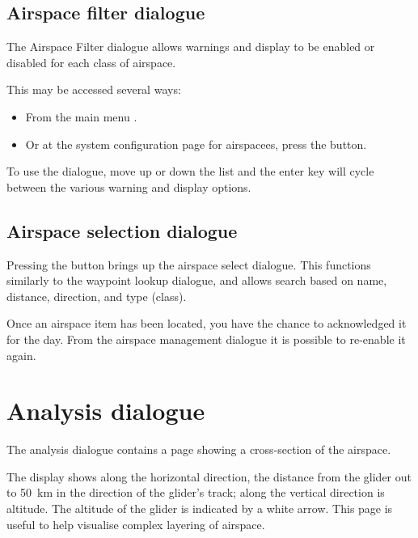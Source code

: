
\subsection*{Airspace filter dialogue}\label{sec:airspace-filter}

The Airspace Filter dialogue allows warnings and display to be enabled
or disabled for each class of airspace.  

This may be accessed several ways:
\begin{itemize}
\item From the main menu \blink{}.
\item Or at the system configuration page for airspacees, press the  button.
\end{itemize}

To use the dialogue, move up or down the list and the enter key will
cycle between the various warning and display options.

\subsection*{Airspace selection dialogue}

Pressing the  button brings up the airspace select dialogue.
This functions similarly to the waypoint lookup dialogue, and allows
search based on name, distance, direction, and type (class).  

Once an airspace item has been located, you have the chance to acknowledged it 
for the day.  From the
airspace management dialogue it is possible to re-enable it again.


\section{Analysis dialogue}

The analysis dialogue contains a page showing a cross-section of the
airspace. 

The display shows along the horizontal direction, the
distance from the glider out to 50~km in the direction of the glider's
track; along the vertical direction is altitude.  The altitude of the
glider is indicated by a white arrow.  This page is useful to help
visualise complex layering of airspace.

